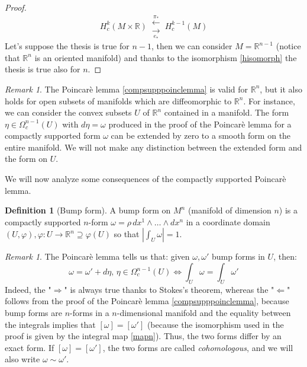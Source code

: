 \documentclass[a4paper,11pt,titlepage, article, oneside]{memoir}
\numberwithin{equation}{section}
\theoremstyle{definition}
\newtheorem{definition}[theorem]{Definition}
\theoremstyle{remark}
\newtheorem{remark}[theorem]{Remark}
\newcommand{\rfield}{\mathbb{R}}
\begin{document}
\begin{proof}
\begin{equation} \label{hisomorph}
H_c^k(M \times \rfield) \,  \substack{\overset{\pi_*}{\longleftarrow} \\ \underset{e_*}{\longrightarrow}} \, H_c^{k-1}(M)
\end{equation}
Let's suppose the thesis is true for $n-1$, then we can consider $M=\rfield^{n-1}$ (notice that $\rfield^n$ is an oriented manifold) and thanks to the isomorphism \eqref{hisomorph} the thesis is true also for $n$.
\end{proof}

\begin{remarkbox}
\begin{remark}
The Poincarè lemma \ref{compsupppoinclemma} is valid for $\rfield^n$, but it also holds for open subsets of manifolds which are diffeomorphic to $\rfield^n$. For instance, we can consider the convex subsets $U$ of $\rfield^n$ contained in a manifold. The form $\eta \in \Omega_c^{n-1}(U)$ with $d\eta=\omega$ produced in the proof of the Poincarè lemma for a compactly supported form $\omega$ can be extended by zero to a smooth form on the entire manifold. We will not make any distinction between the extended form and the form on $U$.
\end{remark}
\end{remarkbox}

We will now analyze some consequences of the compactly supported Poincarè lemma.

\begin{definition}[Bump form] \label{bumpform}
A bump form on $M^n$ (manifold of dimension $n$) is a compactly supported $n$-form $\omega = \rho \, dx^1 \wedge \ldots \wedge dx^n$ in a coordinate domain $(U, \varphi), \varphi \colon U \rightarrow \rfield^n \supseteq \varphi(U)$ so that $\left | \int_U \omega \right | = 1$.
\end{definition}

\begin{remarkbox}\begin{remark} \label{bumpremark}
The Poincarè lemma tells us that: given $\omega, \omega'$ bump forms in $U$, then:
\begin{equation}
\omega = \omega' + d \eta,\, \eta \in \Omega_c^{n-1}(U) \Leftrightarrow \int_U \omega = \int_U \omega'
\end{equation}
Indeed, the "$\Rightarrow$" is always true thanks to Stokes's theorem, whereas the "$\Leftarrow$" follows from the proof of the Poincarè lemma \ref{compsupppoinclemma}, because bump forms are $n$-forms in a $n$-dimensional manifold and the equality between the integrals implies that $[\omega] = [\omega']$ (because the isomorphism used in the proof is given by the integral map \eqref{mapn}). Thus, the two forms differ by an exact form. If $[\omega] = [\omega']$, the two forms are called \textit{cohomologous}, and we will also write $\omega \sim \omega'$.
\end{remark}\end{remarkbox}
\end{document}
